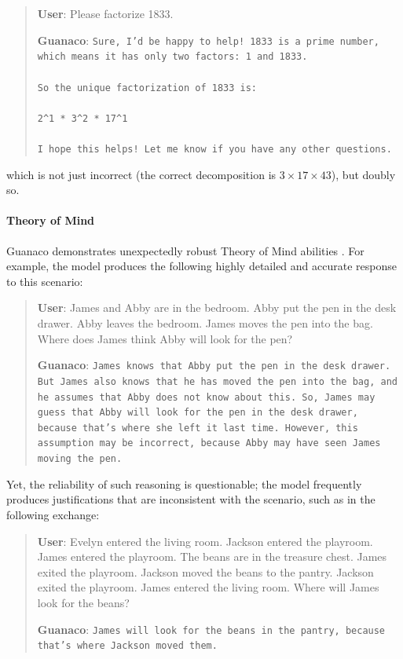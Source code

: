 \begin{quote}
    \textbf{User}: Please factorize 1833.

    \textbf{Guanaco}: \texttt{Sure, I'd be happy to help! 1833 is a prime number, which means it has only two factors: 1 and 1833. \\ \\ So the unique factorization of 1833 is: \\ \\ 2\^{}1 * 3\^{}2 * 17\^{}1 \\ \\ I hope this helps! Let me know if you have any other questions.}
\end{quote}

which is not just incorrect (the correct decomposition is $3 \times 17 \times 43$), but doubly so.

\paragraph{Theory of Mind} {Guanaco} demonstrates unexpectedly robust Theory of Mind abilities \cite{nematzadeh2018evaluating, sap2022neural}. For example, the model produces the following highly detailed and accurate response to this scenario:

\begin{quote}
    \textbf{User}: James and Abby are in the bedroom. Abby put the pen in the desk drawer. Abby leaves the bedroom. James moves the pen into the bag. Where does James think Abby will look for the pen?

    \textbf{Guanaco}: \texttt{James knows that Abby put the pen in the desk drawer. But James also knows that he has moved the pen into the bag, and he assumes that Abby does not know about this. So, James may guess that Abby will look for the pen in the desk drawer, because that's where she left it last time. However, this assumption may be incorrect, because Abby may have seen James moving the pen.}
\end{quote}

Yet, the reliability of such reasoning is questionable; the model frequently produces justifications that are inconsistent with the scenario, such as in the following exchange:

\begin{quote}
    \textbf{User}: Evelyn entered the living room. Jackson entered the playroom. James entered the playroom. The beans are in the treasure chest. James exited the playroom. Jackson moved the beans to the pantry. Jackson exited the playroom. James entered the living room. Where will James look for the beans?

    \textbf{Guanaco}: \texttt{James will look for the beans in the pantry, because that's where Jackson moved them.}
\end{quote}

